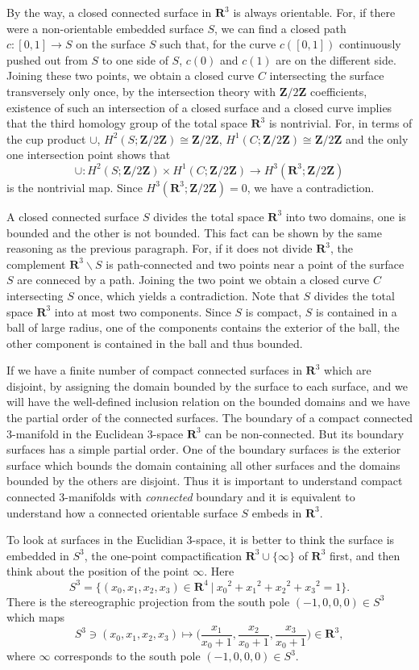 \documentclass{amsart}
\numberwithin{equation}{section}
\newcommand{\RR}{{\boldsymbol{R}}}
\newcommand{\ZZ}{{\boldsymbol{Z}}}
\newcommand{\lra}{\longrightarrow}
\newcommand{\ssm}{\smallsetminus}
\begin{document}
By the way, a closed connected surface in $\RR^3$ is always orientable. 
For, if there were a non-orientable embedded surface $S$, we can find a closed path $c:[0,1]\lra S$ on the surface $S$ such that, for the curve $c([0,1])$ continuously pushed out from $S$ to one side of $S$, $c(0)$ and $c(1)$ are on the different side. Joining these two points, we obtain a closed curve $C$  intersecting the surface transversely only once, by the intersection theory with $\ZZ/2\ZZ$ coefficients, existence of such an intersection of a closed surface and a closed curve implies that the third homology group of the total space $\RR^3$ is nontrivial. For, in terms of the cup product $\cup$, $H^2(S;\ZZ/2\ZZ)\cong \ZZ/2\ZZ$, $H^1(C;\ZZ/2\ZZ)\cong \ZZ/2\ZZ$ and the only one intersection point shows that
$$\cup :H^2(S;\ZZ/2\ZZ)\times H^1(C;\ZZ/2\ZZ) \lra H^3(\RR^3;\ZZ/2\ZZ)$$
is the nontrivial map. Since $H^3(\RR^3;\ZZ/2\ZZ)= 0$, we have a contradiction.

A closed connected surface $S$ divides the total space $\RR^3$ into two domains, one is bounded and the other is not bounded. This fact can be shown by the same reasoning as the previous paragraph. For, if it does not divide $\RR^3$, the complement $\RR^3\ssm S$ is path-connected and
two points near a point of the surface $S$ are conneced by a path. Joining the two point we obtain a closed curve $C$ intersecting $S$ once, which yields a contradiction. Note that $S$ divides the total space $\RR^3$ into at most two components. 
Since $S$ is compact, $S$ is contained in a ball of large radius, one of the components contains the exterior of the ball, the other component is contained in the ball and thus bounded. 

If we have a finite number of compact connected surfaces in $\RR^3$ which are disjoint, by assigning the domain bounded by the surface to each surface, and we will have the well-defined inclusion relation on the bounded domains and we have the partial order of the connected surfaces. 
The boundary of a compact connected 3-manifold in the Euclidean 3-space $\RR^3$ can be non-connected. But its boundary surfaces 
has a simple partial order. One of the boundary surfaces is the exterior surface which bounds the domain containing all other surfaces and the domains bounded by the others are disjoint.
Thus it is important to understand compact connected 3-manifolds with
\textit{connected} boundary and it is equivalent to understand how a connected orientable surface $S$ embeds in $\RR^3$.

To look at surfaces in the Euclidian 3-space, it is better to think the surface is embedded in $S^3$,  the one-point compactification $\RR^3\cup\{\infty\}$ of $\RR^3$ first, and then think about the position of the point $\infty$.
Here $$S^3=\{(x_0,x_1,x_2,x_3)\in \RR^4\ \big| \ x_0{}^2+x_1{}^2+x_2{}^2+x_3{}^2=1\}.$$  There is the stereographic projection from the south pole $(-1,0,0,0)\in S^3$ which maps 
$$S^3\ni (x_0,x_1,x_2,x_3)\longmapsto \big( \dfrac{x_1}{x_0+1},\dfrac{x_2}{x_0+1},\dfrac{x_3}{x_0+1}\big)\in \RR^3,$$
where $\infty$ corresponds to the south pole $(-1,0,0,0)\in S^3$. 
\end{document}
